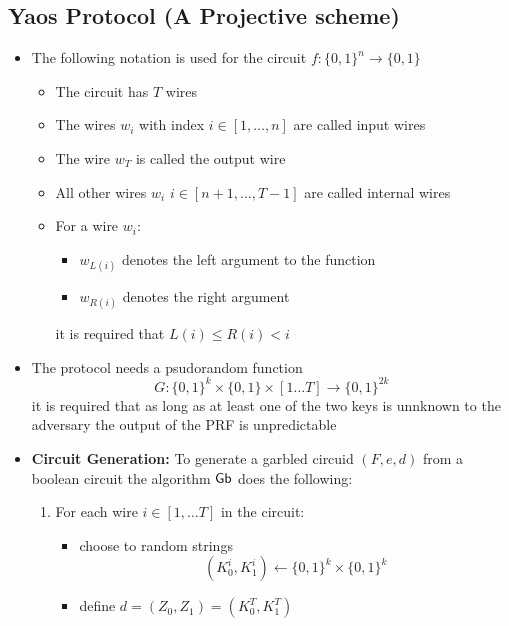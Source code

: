 \subsection{Yaos Protocol (A Projective scheme)}%
\begin{itemize}
    \item The following notation is used for the circuit $f: \{0,1\}^n \to \{0,1\}$
    \begin{itemize}
        \item The circuit has $T$ wires 
        \item The wires $w_i$ with index $i \in [1, \dots, n]$ are called input wires
        \item The wire $w_T$ is called the output wire
        \item All other wires $w_i$ $i \in [n+1, \dots, T-1]$ are called internal wires
        \item For a wire $w_i$:
        \begin{itemize}
            \item $w_{L(i)}$ denotes the left argument to the function 
            \item $w_{R(i)}$ denotes the right argument
        \end{itemize}
        it is required that $L(i) \leq R(i) < i$
    \end{itemize}
    \item The protocol needs a psudorandom function
    \begin{equation*}
        G: \{0,1\}^k \times \{0,1\} \times [1 \dots T] \rightarrow \{0,1\}^{2k}
    \end{equation*}
    it is required that as long as at least one of the two keys is unnknown to the adversary the output of the PRF is unpredictable
    \item \textbf{Circuit Generation:} To generate a garbled circuid $(F, e, d)$ from a boolean circuit the algorithm $\mathsf{Gb}$ does the following:
    \begin{enumerate}
        \item For each wire $i \in [1, \dots T]$ in the circuit:
        \begin{itemize}
            \item choose to random strings
            \begin{equation*}
                (K_0^i, K_1^i) \leftarrow \{0,1\}^k \times \{0,1\}^k
            \end{equation*}
        \item define $d = (Z_0, Z_1) = (K_0^T, K_1^T)$

\end{itemize}
\end{enumerate}
\end{itemize}
